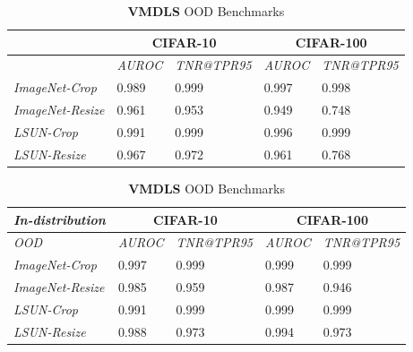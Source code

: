 \documentclass[accepted]{uai2022} %
\begin{document}
\begin{table}[t]
    \setlength\tabcolsep{4pt}
    \centering
    \caption{\textbf{VMDLS}$_\bb$ OOD Benchmarks}
        \label{Tab:ood_vmdls}
         
        \begin{tabular}{@{}lllll@{}}
            \toprule
                                      & \multicolumn{2}{c}{CIFAR-10}      & \multicolumn{2}{c}{CIFAR-100}     \\ \midrule
                                      & \textit{AUROC} & \textit{TNR@TPR95} & \textit{AUROC} & \textit{TNR@TPR95} \\\midrule
            \textit{ImageNet-Crop}    & 0.989          & 0.999            & 0.997          & 0.998            \\
            \textit{ImageNet-Resize}  & 0.961          & 0.953            & 0.949          & 0.748            \\
            \textit{LSUN-Crop}        & 0.991          & 0.999            & 0.996          & 0.999            \\
            \textit{LSUN-Resize}      & 0.967          & 0.972            & 0.961          & 0.768            \\ \bottomrule
        \end{tabular}

        \caption{\textbf{VMDLS} OOD Benchmarks}
        \label{Tab:ood_vmdlsp}
        
        \begin{tabular}{@{}lllll@{}}
            \toprule
            \textit{In-distribution} & \multicolumn{2}{c}{CIFAR-10}      & \multicolumn{2}{c}{CIFAR-100}     \\ \midrule
            \textit{OOD}              & \textit{AUROC} & \textit{TNR@TPR95} & \textit{AUROC} & \textit{TNR@TPR95} \\\midrule
            \textit{ImageNet-Crop}    & 0.997          & 0.999            & 0.999          & 0.999            \\
            \textit{ImageNet-Resize}  & 0.985          & 0.959            & 0.987          & 0.946            \\
            \textit{LSUN-Crop}        & 0.991          & 0.999            & 0.999          & 0.999            \\
            \textit{LSUN-Resize}      & 0.988          & 0.973            & 0.994          & 0.973            \\ \bottomrule
        \end{tabular}
    \end{table}
    
\end{document}
